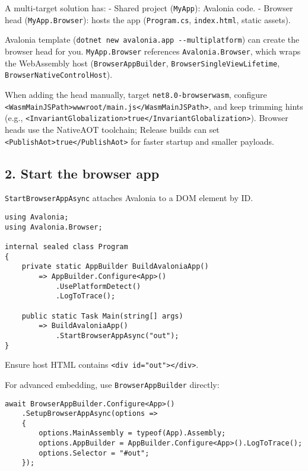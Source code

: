 A multi-target solution has: - Shared project
(\passthrough{\lstinline!MyApp!}): Avalonia code. - Browser head
(\passthrough{\lstinline!MyApp.Browser!}): hosts the app
(\passthrough{\lstinline!Program.cs!},
\passthrough{\lstinline!index.html!}, static assets).

Avalonia template
(\passthrough{\lstinline!dotnet new avalonia.app --multiplatform!}) can
create the browser head for you. \passthrough{\lstinline!MyApp.Browser!}
references \passthrough{\lstinline!Avalonia.Browser!}, which wraps the
WebAssembly host (\passthrough{\lstinline!BrowserAppBuilder!},
\passthrough{\lstinline!BrowserSingleViewLifetime!},
\passthrough{\lstinline!BrowserNativeControlHost!}).

When adding the head manually, target
\passthrough{\lstinline!net8.0-browserwasm!}, configure
\passthrough{\lstinline!<WasmMainJSPath>wwwroot/main.js</WasmMainJSPath>!},
and keep trimming hints (e.g.,
\passthrough{\lstinline!<InvariantGlobalization>true</InvariantGlobalization>!}).
Browser heads use the NativeAOT toolchain; Release builds can set
\passthrough{\lstinline!<PublishAot>true</PublishAot>!} for faster
startup and smaller payloads.

\subsection{2. Start the browser app}\label{start-the-browser-app}

\passthrough{\lstinline!StartBrowserAppAsync!} attaches Avalonia to a
DOM element by ID.

\begin{lstlisting}
using Avalonia;
using Avalonia.Browser;

internal sealed class Program
{
    private static AppBuilder BuildAvaloniaApp()
        => AppBuilder.Configure<App>()
            .UsePlatformDetect()
            .LogToTrace();

    public static Task Main(string[] args)
        => BuildAvaloniaApp()
            .StartBrowserAppAsync("out");
}
\end{lstlisting}

Ensure host HTML contains
\passthrough{\lstinline!<div id="out"></div>!}.

For advanced embedding, use \passthrough{\lstinline!BrowserAppBuilder!}
directly:

\begin{lstlisting}
await BrowserAppBuilder.Configure<App>()
    .SetupBrowserAppAsync(options =>
    {
        options.MainAssembly = typeof(App).Assembly;
        options.AppBuilder = AppBuilder.Configure<App>().LogToTrace();
        options.Selector = "#out";
    });
\end{lstlisting}

